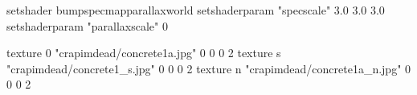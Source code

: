setshader bumpspecmapparallaxworld
setshaderparam "specscale" 3.0 3.0 3.0
setshaderparam "parallaxscale" 0

texture 0 "crapimdead/concrete1a.jpg" 0 0 0 2
texture s "crapimdead/concrete1_s.jpg" 0 0 0 2
texture n "crapimdead/concrete1a_n.jpg" 0 0 0 2
